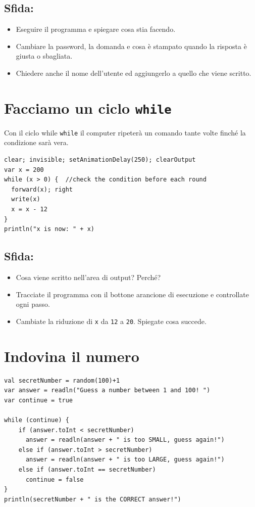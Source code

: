 \section*{\color{BrickRed}Sfida:}


\begin{itemize}

\item {Eseguire il programma e spiegare cosa stia facendo.}
\item {Cambiare la password, la domanda e cosa è stampato quando la risposta è giusta o sbagliata.}
\item {Chiedere anche il nome dell'utente ed aggiungerlo a quello che viene scritto.}

\end{itemize}


\chapter{Facciamo un ciclo \lstinline{while}}Con il ciclo while \lstinline{while} il computer ripeterà un comando tante volte finché la condizione sarà vera.

\begin{lstlisting}[basicstyle={\ttfamily\fontsize{22}{27}\selectfont},numbers=none]
clear; invisible; setAnimationDelay(250); clearOutput
var x = 200
while (x > 0) {  //check the condition before each round 
  forward(x); right
  write(x) 
  x = x - 12
}
println("x is now: " + x)
\end{lstlisting}
        
\section*{\color{BrickRed}Sfida:}


\begin{itemize}

\item {Cosa viene scritto nell'area di output? Perché?}
\item {Tracciate il programma con il bottone arancione di esecuzione e controllate ogni passo.}
\item {Cambiate la riduzione di \lstinline{x} da \lstinline{12} a \lstinline{20}. Spiegate cosa succede.}

\end{itemize}


\chapter{Indovina il numero}
\begin{lstlisting}[basicstyle={\ttfamily\fontsize{16}{19}\selectfont},numbers=none]
val secretNumber = random(100)+1
var answer = readln("Guess a number between 1 and 100! ")
var continue = true

while (continue) {
    if (answer.toInt < secretNumber)
      answer = readln(answer + " is too SMALL, guess again!")
    else if (answer.toInt > secretNumber)
      answer = readln(answer + " is too LARGE, guess again!")
    else if (answer.toInt == secretNumber)
      continue = false
}
println(secretNumber + " is the CORRECT answer!")
\end{lstlisting}
        
